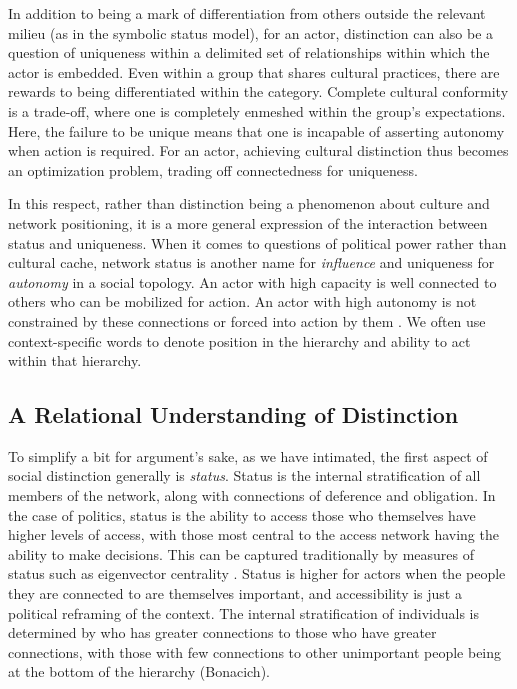 \documentclass[12pt]{article}
\begin{document}
In addition to being a mark of differentiation from others outside the relevant milieu (as in the symbolic status model), for an actor, distinction can also be a question of uniqueness within a delimited set of relationships within which the actor is embedded. Even within a group that shares cultural practices, there are rewards to being differentiated within the category. Complete cultural conformity is a trade-off, where one is completely enmeshed within the group's expectations. Here, the failure to be unique means that one is incapable of asserting autonomy when action is required. For an actor, achieving cultural distinction thus becomes an optimization problem, trading off connectedness for uniqueness.  

In this respect, rather than distinction being a phenomenon about culture and network positioning, it is a more general expression of the interaction between status and uniqueness. When it comes to questions of political power rather than cultural cache, network status is another name for \textit{influence} and uniqueness for \textit{autonomy} in a social topology. An actor with high capacity is well connected to others who can be mobilized for action. An actor with high autonomy is not constrained by these connections or forced into action by them \citep{burt76}. We often use context-specific words to denote position in the hierarchy and ability to act within that hierarchy.

\subsection{A Relational Understanding of Distinction}
To simplify a bit for argument's sake, as we have intimated, the first aspect of social distinction generally is \textit{status}. Status is the internal stratification of all members of the network, along with connections of deference and obligation. In the case of politics, status is the ability to access those who themselves have higher levels of access, with those most central to the access network having the ability to make decisions. This can be captured traditionally by measures of status such as eigenvector centrality \citep{bonacich72}. Status is higher for actors when the people they are connected to are themselves important, and accessibility is just a political reframing of the context. The internal stratification of individuals is determined by who has greater connections to those who have greater connections, with those with few connections to other unimportant people being at the bottom of the hierarchy (Bonacich).  
\end{document}
